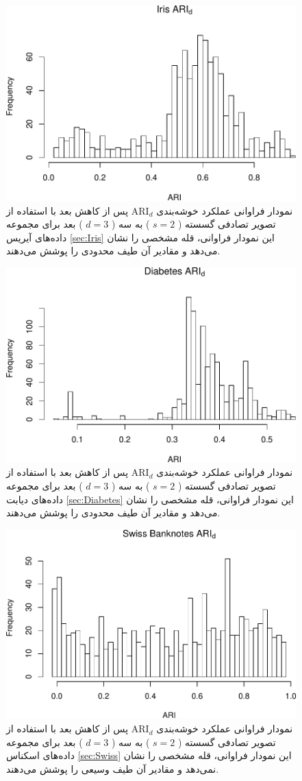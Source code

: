 \begin{figure}[H]
\centering
\includegraphics[width=0.7\linewidth]{Report_files/figure-latex/unnamed-chunk-18-2}
\caption{
نمودار فراوانی عملکرد خوشه‌بندی 
$\mathrm{ARI}_d$
پس از کاهش بعد با استفاده از تصویر تصادفی
گسسته (%
$s=2$%
)
به
سه (%
$d=3$%
)
بعد برای مجموعه داده‌های
آیریس
\ref{sec:Iris}
این نمودار فراوانی،
قله
مشخصی را نشان 
می‌دهد
و مقادیر آن طیف 
محدودی
 را پوشش می‌دهند.
}
\end{figure}

\begin{figure}[H]
\centering
\includegraphics[width=0.7\linewidth]{Report_files/figure-latex/unnamed-chunk-18-3}
\caption{
نمودار فراوانی عملکرد خوشه‌بندی 
$\mathrm{ARI}_d$
پس از کاهش بعد با استفاده از تصویر تصادفی
گسسته (%
$s=2$%
)
به
سه (%
$d=3$%
)
بعد برای مجموعه داده‌های
دیابت
\ref{sec:Diabetes}
این نمودار فراوانی،
قله
مشخصی را نشان 
می‌دهد
و مقادیر آن طیف 
محدودی
 را پوشش می‌دهند.
}
\end{figure}

\begin{figure}[H]
\centering
\includegraphics[width=0.7\linewidth]{Report_files/figure-latex/unnamed-chunk-18-4}
\caption{
نمودار فراوانی عملکرد خوشه‌بندی 
$\mathrm{ARI}_d$
پس از کاهش بعد با استفاده از تصویر تصادفی
گسسته (%
$s=2$%
)
به
سه (%
$d=3$%
)
بعد برای مجموعه داده‌های
اسکناس
\ref{sec:Swiss}
این نمودار فراوانی،
قله
مشخصی را نشان 
نمی‌دهد
و مقادیر آن طیف 
وسیعی را پوشش می‌دهند.
}
\end{figure}

